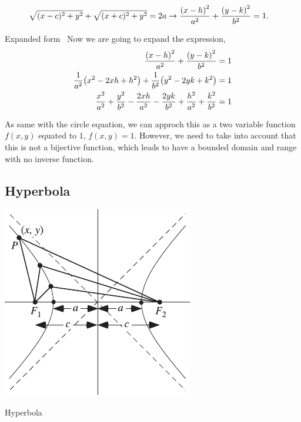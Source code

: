 \documentclass[../main-notes.tex]{subfile}
\begin{document}
\begin{align*}
    \sqrt{(x-c)^2+y^2} + \sqrt{(x+c)^2+y^2} = 2a\to\frac{\qty(x-h)^2}{a^2} + \frac{\qty(y-k)^2}{b^2} &= 1.
\end{align*}

\begin{note}{Expanded form}{~}
Now we are going to expand the expression,
\begin{align*}
    \frac{\qty(x-h)^2}{a^2} + \frac{\qty(y-k)^2}{b^2} &= 1 \\
    \frac{1}{a^2}\qty(x^2-2xh+h^2) + \frac{1}{b^2}\qty(y^2-2yk+k^2) &= 1 \\
    \frac{x^2}{a^2} + \frac{y^2}{b^2}
    -\frac{2xh}{a^2} -\frac{2yk}{b^2}
    +\frac{h^2}{a^2} + \frac{k^2}{b^2} &= 1
\end{align*}

As same with the circle equation, we can approch this as a two variable function $f(x,y)$ equated to $1$, $f(x,y)=1$.
However, we need to take into account that this is not a bijective function, which leads to have a bounded domain and range with no inverse function.
\end{note}

\subsection{Hyperbola}

\begin{marginfigure}
    \centering
    \includegraphics[width=\textwidth]{../Figures/hyperbola/HyperbolaFoci_750.pdf}
    \caption{Hyperbola}\label{fig-hyperbola-recap}
\end{marginfigure}
\end{document}
